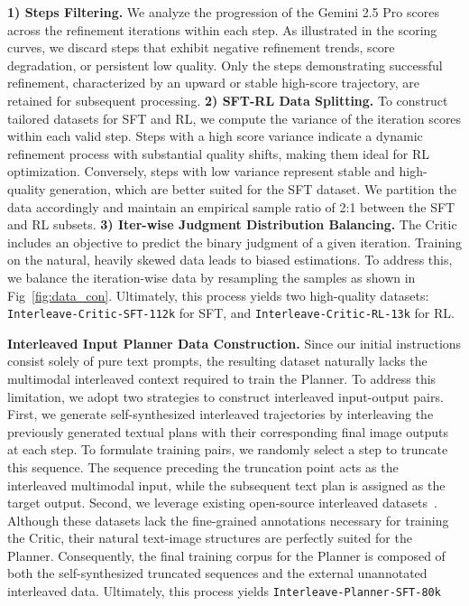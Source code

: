 \documentclass{article} %
\begin{document}
\textbf{1) Steps Filtering.} We analyze the progression of the Gemini 2.5 Pro scores across the refinement iterations within each step. As illustrated in the scoring curves, we discard steps that exhibit negative refinement trends, score degradation, or persistent low quality. Only the steps demonstrating successful refinement, characterized by an upward or stable high-score trajectory, are retained for subsequent processing.
\textbf{2) SFT-RL Data Splitting.} To construct tailored datasets for SFT and RL, we compute the variance of the iteration scores within each valid step. Steps with a high score variance indicate a dynamic refinement process with substantial quality shifts, making them ideal for RL optimization. Conversely, steps with low variance represent stable and high-quality generation, which are better suited for the SFT dataset. We partition the data accordingly and maintain an empirical sample ratio of 2:1 between the SFT and RL subsets.
\textbf{3) Iter-wise Judgment Distribution Balancing.} The Critic includes an objective to predict the binary judgment of a given iteration. Training on the natural, heavily skewed data leads to biased estimations. To address this, we balance the iteration-wise data by resampling the samples as shown in Fig~\ref{fig:data_con}. Ultimately, this process yields two high-quality datasets: \texttt{Interleave-Critic-SFT-112k} for SFT, and \texttt{Interleave-Critic-RL-13k} for RL.

\textbf{Interleaved Input Planner Data Construction.} Since our initial instructions consist solely of pure text prompts, the resulting dataset naturally lacks the multimodal interleaved context required to train the Planner. To address this limitation, we adopt two strategies to construct interleaved input-output pairs. First, we generate self-synthesized interleaved trajectories by interleaving the previously generated textual plans with their corresponding final image outputs at each step. To formulate training pairs, we randomly select a step to truncate this sequence. The sequence preceding the truncation point acts as the interleaved multimodal input, while the subsequent text plan is assigned as the target output. Second, we leverage existing open-source interleaved datasets~\cite{chen2024comm}. Although these datasets lack the fine-grained annotations necessary for training the Critic, their natural text-image structures are perfectly suited for the Planner. Consequently, the final training corpus for the Planner is composed of both the self-synthesized truncated sequences and the external unannotated interleaved data. Ultimately, this process yields \texttt{Interleave-Planner-SFT-80k}
\end{document}
